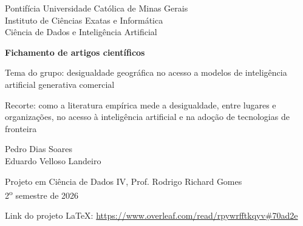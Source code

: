 \documentclass[12pt,a4paper]{article}
\newcommand{\linkprojeto}{\url{https://www.overleaf.com/read/rpywrfftkqyv\#70ad2e}}
\begin{document}
\hypersetup{pageanchor=false}
\begin{titlepage}
\centering
{\large Pontifícia Universidade Católica de Minas Gerais\\
Instituto de Ciências Exatas e Informática\\
Ciência de Dados e Inteligência Artificial\par}
\vspace{4cm}
{\LARGE\bfseries Fichamento de artigos científicos\par}
\vspace{1cm}
{\large Tema do grupo: desigualdade geográfica no acesso a modelos de inteligência
artificial generativa comercial\par}
\vspace{0.5cm}
{Recorte: como a literatura empírica mede a desigualdade, entre lugares e organizações,
no acesso à inteligência artificial e na adoção de tecnologias de fronteira\par}
\vspace{3cm}
{\large Pedro Dias Soares\\Eduardo Velloso Landeiro\par}
\vfill
{Projeto em Ciência de Dados IV, Prof. Rodrigo Richard Gomes\\
2\textsuperscript{o} semestre de 2026\par}
\vspace{1cm}
{\small Link do projeto LaTeX: \linkprojeto\par}
\end{titlepage}
\hypersetup{pageanchor=true}


\clearpage

\clearpage

\clearpage

\clearpage


\clearpage
\printbibliography[title={Referências}]
\end{document}

